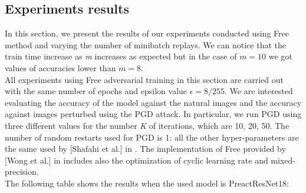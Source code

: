 \documentclass{article}
\begin{document}
\subsection{Experiments results}
In this section, we present the results of our experiments conducted using Free method and varying the number of minibatch replays. We can notice that the train time increase as \textit{m} increases as expected but in the case of $m=10$ we got values of accuracies lower than $m=8$.\\
All experiments using Free adversarial training in this section are carried out with the same number of epochs and epsilon value $\epsilon = 8/255$. We are interested evaluating the accuracy of the model against the natural images and the accuracy against images perturbed using the PGD attack. In particular, we run PGD using three different values for the number \textit{K} of iterations, which are {10, 20, 50}. The number of random restarts used for PGD is 1; all the other hyper-parameters are the same used by [Shafahi et al.] in \cite{ShafahiEtAl2019b}. The implementation of Free provided by [Wong et al.] in \cite{WongEtAl2020} includes also the optimization of cyclic learning rate and mixed-precision.\\
The following table shows the results when the used model is PreactResNet18:
\end{document}
